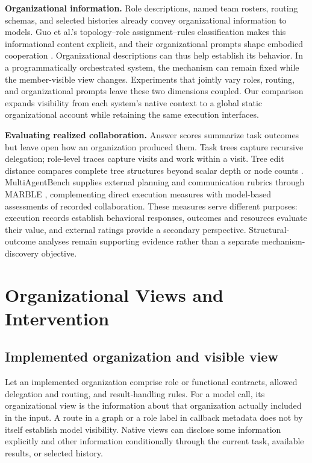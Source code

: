 \documentclass[10pt,letterpaper,twocolumn]{article}
\begin{document}
\textbf{Organizational in\-for\-ma\-tion.} Role de\-scrip\-tions, named team rosters, routing schemas, and selected histories already convey or\-ga\-ni\-za\-tion\-al in\-for\-ma\-tion to mod\-els. Guo et al.'s topo\-lo\-gy--\allowbreak{}role as\-sign\-ment--\allowbreak{}rules classification makes this informational content explicit, and their or\-ga\-ni\-za\-tion\-al prompts shape embodied cooperation \cite{guoorganized}. Organizational de\-scrip\-tions can thus help establish its behavior. In a programmatically orchestrated sys\-tem, the mech\-a\-nism can remain fixed while the member-visible view changes. Experiments that jointly vary roles, routing, and or\-ga\-ni\-za\-tion\-al prompts leave these two dimensions coupled. Our comparison expands vis\-i\-bil\-i\-ty from each sys\-tem's na\-tive con\-text to a global stat\-ic or\-ga\-ni\-za\-tion\-al account while retaining the same ex\-e\-cu\-tion in\-ter\-faces.

\textbf{Evaluating realized col\-lab\-o\-ra\-tion.} Answer scores summarize task out\-comes but leave open how an or\-ga\-ni\-za\-tion produced them. Task trees cap\-ture re\-cur\-sive del\-e\-ga\-tion; role-level traces cap\-ture visits and work within a visit. Tree edit distance compares complete tree structures beyond scalar depth or node counts \cite{apted}. MultiAgentBench supplies external planning and communication rubrics through MARBLE \cite{mab}, complementing direct ex\-e\-cu\-tion mea\-sures with mod\-el-based assessments of re\-cord\-ed col\-lab\-o\-ra\-tion. These mea\-sures serve dif\-fer\-ent purposes: ex\-e\-cu\-tion re\-cords establish behavioral responses, out\-comes and resources evaluate their value, and external ratings provide a secondary perspective. Struc\-tur\-al-out\-come analyses remain supporting evidence rather than a separate mech\-a\-nism-dis\-cov\-ery objective.

\section{Organizational Views and Intervention}
\subsection{Implemented or\-ga\-ni\-za\-tion and visible view}
Let an implemented or\-ga\-ni\-za\-tion comprise role or functional contracts, allowed del\-e\-ga\-tion and routing, and result-handling rules. For a mod\-el call, its or\-ga\-ni\-za\-tion\-al view is the in\-for\-ma\-tion about that or\-ga\-ni\-za\-tion actually included in the input. A route in a graph or a role label in callback metadata does not by itself establish mod\-el vis\-i\-bil\-i\-ty. Native views can disclose some in\-for\-ma\-tion explicitly and other in\-for\-ma\-tion conditionally through the current task, available results, or selected history.
\end{document}
